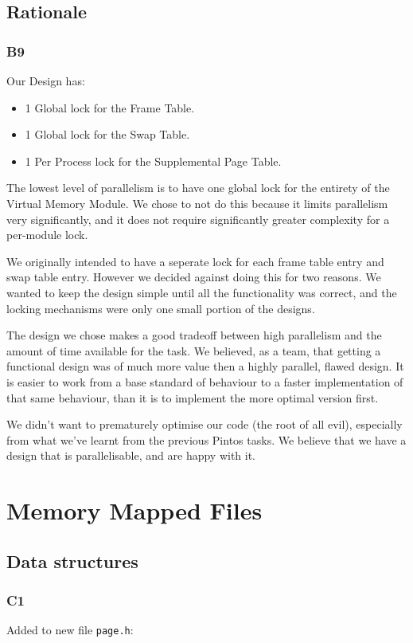 \documentclass[a4wide, 11pt]{article}
\newcommand{\tx}{\texttt}
\begin{document}
\subsection{Rationale}
\subsubsection{B9}

Our Design has:
\begin{itemize}
\item 1 Global lock for the Frame Table.
\item 1 Global lock for the Swap Table.
\item 1 Per Process lock for the Supplemental Page Table.
\end{itemize}

The lowest level of parallelism is to have one global lock for the entirety of the Virtual Memory Module. We chose to not do this because it limits parallelism very significantly, and it does not require significantly greater complexity for a per-module lock.

We originally intended to have a seperate lock for each frame table entry and swap table entry. However we decided against doing this for two reasons. We wanted to keep the design simple until all the functionality was correct, and the locking mechanisms were only one small portion of the designs.

The design we chose makes a good tradeoff between high parallelism and the amount of time available for the task. We believed, as a team, that getting a functional design was of much more value then a highly parallel, flawed design. It is easier to work from a base standard of behaviour to a faster implementation of that same behaviour, than it is to implement the more optimal version first.

We didn't want to prematurely optimise our code (the root of all evil), especially from what we've learnt from the previous Pintos tasks. We believe that we have a design that is parallelisable, and are happy with it.



\section{Memory Mapped Files}
\subsection{Data structures}
\subsubsection{C1}
Added to new file \tx{page.h}:
\end{document}
